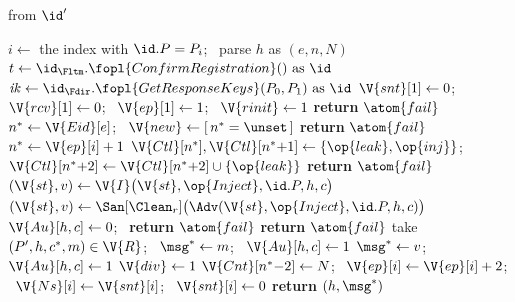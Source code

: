 \begin{interface}
{ \quad from $\id'$
\begin{algorithmic}[1]
\algcont
{}
\State $i \gets$ the index with $\id.P = P_i$; \ parse $h$ as $(e, n, N)$
   \label{ln:smresponder}
  \State $t \gets \id_{\Fltm}.\fopl{ConfirmRegistration}() \text{ as } \id$
  \State $\mathit{ik} \gets \id_{\Fdir}.\fopl{GetResponseKeys}(P_0, P_1) \text{ as } \id$
  \State $\V{snt}[1] \gets 0$; \ $\V{rcv}[1] \gets 0$; \ $\V{ep}[1] \gets 1$; \ $\V{rinit} \gets 1$ \label{ln:smoffset}
\EndIf
{} \label{ln:smreplay}
  \State \textbf{return} $\atom{fail}$
\EndIf
\State $n^{*} \gets \V{Eid}[e]$; \ $\V{new} \gets [\, n^{*} = \unset \,]$
 \label{ln:smnoswitch}
  \State \textbf{return} $\atom{fail}$
\EndIf
{}
  \State $n^{*} \gets \V{ep}[i] + 1$
\EndIf
{} \label{ln:smdelayheal}
  \State $\V{Ctl}[n^{*}], \V{Ctl}[n^{*}{+}1] \gets \{\op{leak},\op{inj}\}$; \ $\V{Ctl}[n^{*}{+}2] \gets \V{Ctl}[n^{*}{+}2] \cup \{\op{leak}\}$
\EndIf
{} \label{ln:smpasttail}
  \State \textbf{return} $\atom{fail}$
\EndIf
{}
  \State $(\V{st}, v) \gets \V{I}\bigl(\V{st}, \op{Inject}, \id.P, h, c\bigr)$
\EndIf
{}
  \State $(\V{st}, v) \gets \San[\Clean_{r}]\bigl(\Adv(\V{st}, \op{Inject}, \id.P, h, c)\bigr)$ \label{ln:smadvinject}
\EndIf
{}
  \State $\V{Au}[h, c] \gets 0$; \ \textbf{return} $\atom{fail}$
\EndIf
{}
  \State \textbf{return} $\atom{fail}$
\EndIf
{}
  \State take $(P', h, c^{*}, m) \in \V{R}$; \ $\msg^{*} \gets m$; \ $\V{Au}[h, c] \gets 1$ \label{ln:smhonestmac}
\EndIf
{}
  \State $\msg^{*} \gets v$; \ $\V{Au}[h, c] \gets 1$ \label{ln:smadvchooses}
\EndIf
{}
  \State $\V{div} \gets 1$ \label{ln:smdiverge}
\EndIf
{} \label{ln:smadvance}
  \State $\V{Cnt}[n^{*}{-}2] \gets N$; \ $\V{ep}[i] \gets \V{ep}[i] + 2$; \ $\V{Ns}[i] \gets \V{snt}[i]$; \ $\V{snt}[i] \gets 0$
\EndIf
\State \textbf{return} $(h, \msg^{*})$
\algsave
\end{algorithmic}
\vspace{1.4ex}

}
\end{interface}
